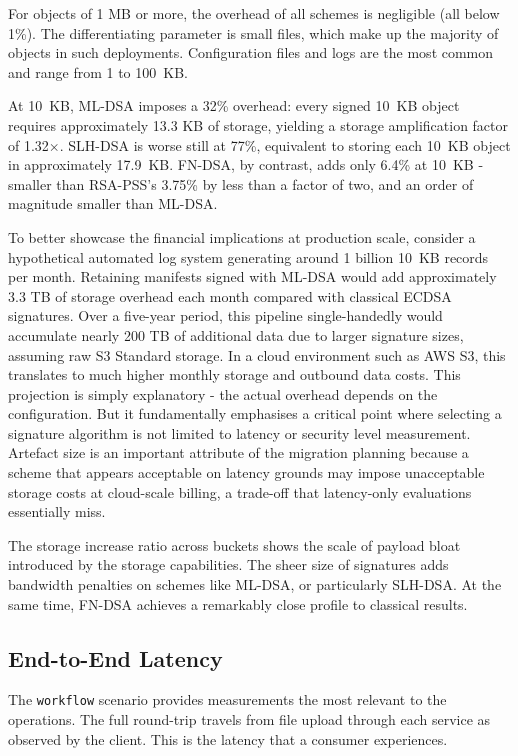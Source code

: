 \documentclass[12pt,a4paper]{article}
\begin{document}
For objects of 1 MB or more, the overhead of all schemes is negligible (all below 1\%). The differentiating parameter is small files, which make up the majority of objects in such deployments. Configuration files and logs are the most common and range from 1 to 100~KB.

At 10~KB, ML-DSA imposes a 32\% overhead: every signed 10~KB object requires approximately 13.3 KB of storage, yielding a storage amplification factor of 1.32$\times$. SLH-DSA is worse still at 77\%, equivalent to storing each 10~KB object in approximately 17.9~KB. FN-DSA, by contrast, adds only 6.4\% at 10~KB - smaller than RSA-PSS’s 3.75\% by less than a factor of two, and an order of magnitude smaller than ML-DSA.

To better showcase the financial implications at production scale, consider a hypothetical automated log system generating around 1 billion 10~KB records per month. Retaining manifests signed with ML-DSA would add approximately 3.3 TB of storage overhead each month compared with classical ECDSA signatures. Over a five-year period, this pipeline single-handedly would accumulate nearly 200 TB of additional data due to larger signature sizes, assuming raw S3 Standard storage. In a cloud environment such as AWS S3, this translates to much higher monthly storage and outbound data costs. This projection is simply explanatory - the actual overhead depends on the configuration. But it fundamentally emphasises a critical point where selecting a signature algorithm is not limited to latency or security level measurement. Artefact size is an important attribute of the migration planning because a scheme that appears acceptable on latency grounds may impose unacceptable storage costs at cloud-scale billing, a trade-off that latency-only evaluations essentially miss.

The storage increase ratio across buckets shows the scale of payload bloat introduced by the storage capabilities. The sheer size of signatures adds bandwidth penalties on schemes like ML-DSA, or particularly SLH-DSA. At the same time, FN-DSA achieves a remarkably close profile to classical results.

\subsection{End-to-End Latency}
\label{sec:results:e2e}

The \texttt{workflow} scenario provides measurements the most relevant to the operations. The full round-trip travels from file upload through each service as observed by the client. This is the latency that a consumer experiences.
\end{document}
